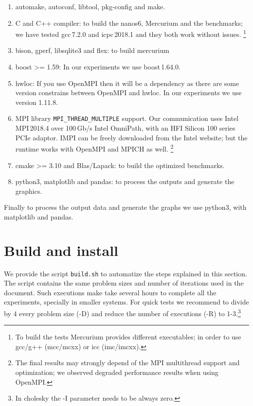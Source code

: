 \documentclass{article}
\newcommand{\code}[1]{\texttt{#1}}
\begin{document}
\begin{enumerate}
    \item automake, autoconf, libtool, pkg-config and make.

    \item C and C++ compiler: to build the nanos6, Mercurium and the benchmarks;
        we have tested gcc\,7.2.0 and icpc\,2018.1 and they both work without
        issues.
        \footnote{To build the tests Mercurium provides different executables;
        in order to use gcc/g++ (mcc/mcxx) or icc (imc/imcxx).}

    \item bison, gperf, libsqlite3 and flex: to build mercurium

    \item boost >= 1.59: In our experiments we use boost\,1.64.0.

    \item hwloc: If you use OpenMPI then it will be a dependency as there are some
        version constrains between OpenMPI and hwloc. In our experiments we use
        version 1.11.8.

    \item MPI library \code{MPI\_THREAD\_MULTIPLE} support. Our communication
        uses Intel MPI\,2018.4 over 100\,Gb/s Intel OmniPath, with an HFI Silicon
        100 series PCIe adaptor.  IMPI can be freely downloaded from the Intel
        website; but the runtime works with OpenMPI and MPICH as well.
        \footnote{The final results may strongly depend of the MPI multithread
        support and optimization; we observed degraded performance results
        when using OpenMPI.}

    \item cmake >= 3.10 and Blas/Lapack: to build the optimized benchmarks.

    \item python3, matplotlib and pandas: to process the outputs and generate the graphics.

\end{enumerate}

Finally to process the output data and generate the graphs we use
python3, with matplotlib and pandas.

\section{Build and install}

We provide the script \code{build.sh} to automatize the steps
explained in this section. The script contains the same problem sizes
and number of iterations used in the document. Such executions make
take several hours to complete all the experiments, specially in
smaller systems. For quick tests we recommend to divide by 4 every
problem size (-D) and reduce the number of executions (-R) to
1-3.\footnote{In cholesky the -I parameter needs to be always zero.}
\end{document}
